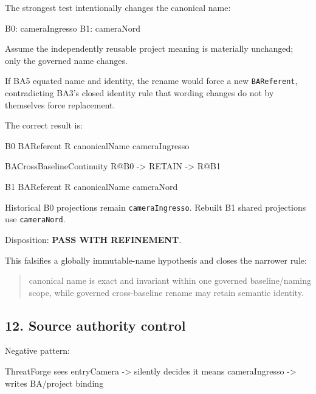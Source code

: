 \documentclass[
  10pt,
  a4paper,
]{article}
\newenvironment{Shaded}{}{}
\newcommand{\NormalTok}[1]{#1}
\begin{document}
The strongest test intentionally changes the canonical name:

\begin{Shaded}
\begin{Highlighting}[]
\NormalTok{B0: cameraIngresso}
\NormalTok{B1: cameraNord}
\end{Highlighting}
\end{Shaded}

Assume the independently reusable project meaning is materially
unchanged; only the governed name changes.

If BA5 equated name and identity, the rename would force a new
\texttt{BAReferent}, contradicting BA3's closed identity rule that
wording changes do not by themselves force replacement.

The correct result is:

\begin{Shaded}
\begin{Highlighting}[]
\NormalTok{B0 BAReferent R}
\NormalTok{  canonicalName cameraIngresso}

\NormalTok{BACrossBaselineContinuity}
\NormalTok{  R@B0 {-}\textgreater{} RETAIN {-}\textgreater{} R@B1}

\NormalTok{B1 BAReferent R}
\NormalTok{  canonicalName cameraNord}
\end{Highlighting}
\end{Shaded}

Historical B0 projections remain \texttt{cameraIngresso}. Rebuilt B1
shared projections use \texttt{cameraNord}.

Disposition: \textbf{PASS WITH REFINEMENT}.

This falsifies a globally immutable-name hypothesis and closes the
narrower rule:

\begin{quote}
canonical name is exact and invariant within one governed
baseline/naming scope, while governed cross-baseline rename may retain
semantic identity.
\end{quote}

\subsection{12. Source authority
control}\label{source-authority-control}

Negative pattern:

\begin{Shaded}
\begin{Highlighting}[]
\NormalTok{ThreatForge sees entryCamera}
\NormalTok{  {-}\textgreater{} silently decides it means cameraIngresso}
\NormalTok{  {-}\textgreater{} writes BA/project binding}
\end{Highlighting}
\end{Shaded}
\end{document}
